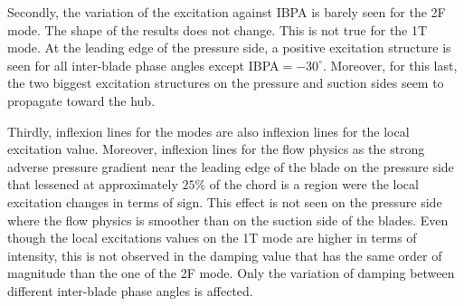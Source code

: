 Secondly, the variation of the excitation against IBPA
is barely seen for the 2F mode. The shape of the
results does not change. This is not true for the
1T mode. At the leading edge of the pressure side,
a positive excitation structure is seen for all inter-blade phase
angles except
\mbox{IBPA$=-30^\circ$}. Moreover, for this last, 
the two biggest excitation structures on the pressure 
and suction sides seem to propagate toward the hub.

Thirdly, inflexion lines
for the modes are also inflexion lines for the local excitation
value. Moreover, inflexion lines for the flow physics as the
strong adverse pressure gradient near the leading edge of the blade
on the pressure side that lessened at approximately $25\%$ of the chord
is a region were the local excitation changes in terms of sign.
This effect is not seen on the pressure side where the flow physics
is smoother than on the suction side of the blades. Even though the
local excitations values on the 1T mode are higher in terms of
intensity, this is not observed in the damping value that
has the same order of magnitude than the one of the 2F mode.
Only the variation of damping between different inter-blade phase angles
is affected. 

